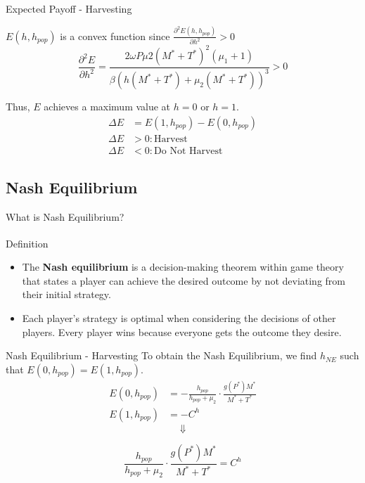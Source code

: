 \documentclass{beamer}
\begin{document}
\begin{frame}{Expected Payoff - Harvesting}

$E(h, h_{pop})$ is a convex function since 
$\frac{\partial^{2}E(h, h_{pop})}{\partial h^{2}} > 0$ \\

$$\displaystyle {\frac{\partial ^ {2} E}{\partial h^{2}} = \frac{2 \omega P \mu{2} (M^{*}+T^{*})^{2} (\mu_{1} +1)}{\beta(h(M^{*}+T^{*}) + \mu_{2}(M^{*}+T^{*}))^{3}} > 0}$$
\vspace{0.6cm}

Thus, $E$ achieves a maximum value at $h = 0$ or $h=1$.\\
\begin{align*}
    \Delta E &= E(1, h_{pop}) - E(0, h_{pop}) \\
    \Delta E &> 0: \text{Harvest} \\
    \Delta E &< 0: \text{Do Not Harvest}
\end{align*}
\end{frame}

\subsection{Nash Equilibrium}
\begin{frame}{What is Nash Equilibrium?}
    \begin{block}{Definition\textsuperscript{\cite{nash_definition}}}
        \begin{itemize}
            \item The \textbf{Nash equilibrium} is a decision-making theorem within game theory that states a player can achieve the desired outcome by not deviating from their initial strategy.
            \item Each player's strategy is optimal when considering the decisions of other players. Every player wins because everyone gets the outcome they desire.
        \end{itemize}
    \end{block}
\end{frame}

\begin{frame}{Nash Equilibrium - Harvesting}
    To obtain the Nash Equilibrium, we find $h_{NE}$ such that $E(0, h_{pop}) = E(1, h_{pop})$. \\
    \begin{align*}
        E(0, h_{pop}) &= -\frac{h_{pop}}{h_{pop} + \mu_{2}} \cdot \frac{g(P^{*})M^{*}}{M^{*} + T^{*}} \\
        E(1, h_{pop}) &= -C^{h}
    \end{align*}
    $$\Downarrow$$
    
    $$\frac{h_{pop}}{h_{pop} + \mu_{2}} \cdot \frac{g(P^{*})M^{*}}{M^{*} + T^{*}} = C^{h}$$

\end{frame}
            
\end{document}
